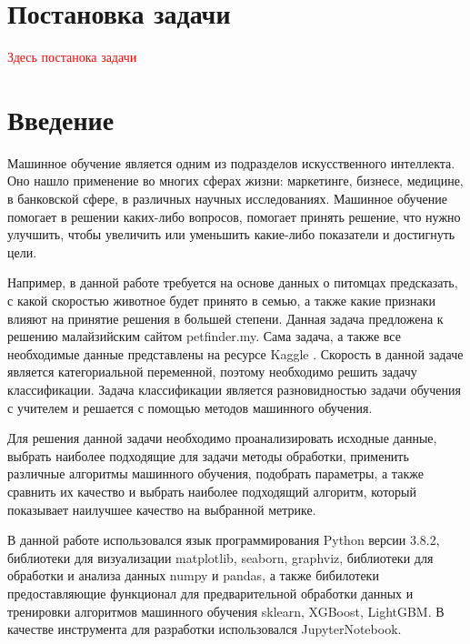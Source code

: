 \documentclass[14pt]{mmcs_article}
\begin{document}

\renewcommand{\contentsname}{Оглавление}

\tableofcontents

\newpage
{}

\section*{Постановка задачи}


\textcolor{red}{Здесь постанока задачи}


\newpage
{}
\section*{Введение}

Машинное обучение является одним из подразделов искусственного интеллекта. Оно нашло применение во многих сферах жизни: маркетинге, бизнесе, медицине, в банковской сфере, в различных научных исследованиях. Машинное обучение помогает в решении каких-либо вопросов, помогает принять решение, что нужно улучшить, чтобы увеличить или уменьшить какие-либо показатели и достигнуть цели. 

Например, в данной работе требуется на основе данных о питомцах предсказать, с какой скоростью животное будет принято в семью, а также какие признаки влияют на принятие решения в большей степени. Данная задача предложена к решению малайзийским сайтом petfinder.my. Сама задача, а также все необходимые данные представлены на ресурсе Kaggle \cite{lib:taskkaggle}. Скорость в данной задаче является категориальной переменной, поэтому необходимо решить задачу классификации. Задача классификации является разновидностью задачи обучения с учителем и решается с помощью методов машинного обучения. 

Для решения данной задачи необходимо проанализировать исходные данные, выбрать наиболее подходящие для задачи методы обработки, применить различные алгоритмы машинного обучения, подобрать параметры, а также сравнить их качество и выбрать наиболее подходящий алгоритм, который показывает наилучшее качество на выбранной метрике.

В данной работе использовался язык программирования Python версии 3.8.2, библиотеки для визуализации matplotlib, seaborn, graphviz, библиотеки для обработки и анализа данных numpy и pandas, а также бибилотеки предоставляющие функционал для предварительной обработки данных и тренировки алгоритмов машинного обучения sklearn, XGBoost, LightGBM. В качестве инструмента для разработки использовался JupyterNotebook.
\end{document}
